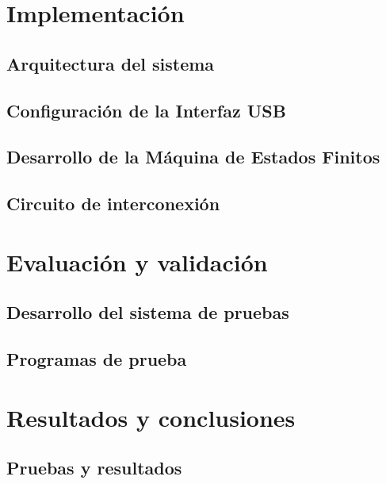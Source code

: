 \documentclass[11pt,a4paper,table]{beamer}
\begin{document}
	\section{Implementación}
		\subsection{Arquitectura del sistema}
			
		\subsection{Configuración de la Interfaz USB}
			
		\subsection{Desarrollo de la Máquina de Estados Finitos}
			
		\subsection{Circuito de interconexión}
			
	\section{Evaluación y validación}
		\subsection{Desarrollo del sistema de pruebas}
			
%			
%			
%			
		\subsection{Programas de prueba}
			
	\section{Resultados y conclusiones}
		\subsection{Pruebas y resultados}
			
\end{document}
